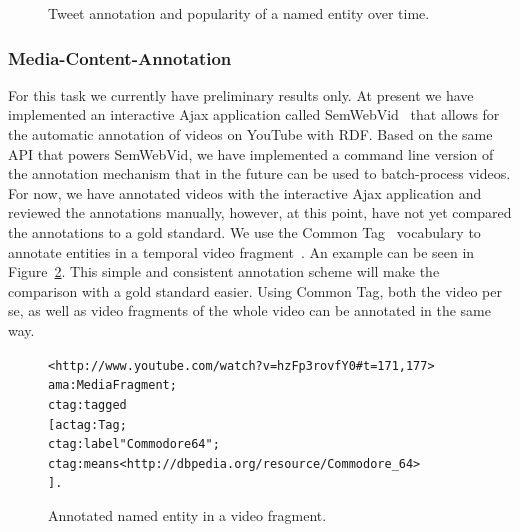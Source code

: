 \documentclass[runningheads,a4paper]{llncs}
\newenvironment{code}[1]
{\begin{lrbox}{\inverbatim}\begin{minipage}{12cm}\begin{alltt}{#1}}
{\end{alltt}\end{minipage}\end{lrbox}\colorbox{lightgray}{\usebox{\inverbatim}}}
\begin{document}
\begin{figure}[htb!]
  \begin{center}
\hspace{5pt}
  \caption{Tweet annotation and popularity of a named entity over time.}
  \label{fig:overtime}
  \end{center}  
\end{figure}

\subsubsection{Media-Content-Annotation}
For this task we currently have preliminary results only. At present we have implemented an interactive Ajax application called SemWebVid~\cite{semwebvid} that allows for the automatic annotation of videos on YouTube with RDF. Based on the same API that powers SemWebVid, we have implemented a command line version of the annotation mechanism that in the future can be used to batch-process videos. For now, we have annotated videos with the interactive Ajax application and reviewed the annotations manually, however, at this point, have not yet compared the annotations to a gold standard. We use the Common Tag~\cite{CommonTag:Spec} vocabulary to annotate entities in a temporal video fragment~\cite{W3C:MediaFrags}. An example can be seen in Figure~\ref{code:ctag}. This simple and consistent annotation scheme will make the comparison with a gold standard easier. Using Common Tag, both the video per se, as well as video fragments of the whole video can be annotated in the same way.

\begin{figure}[htbp!]
\begin{center}
{\footnotesize
\begin{code}
<http://www. youtube.com/watch?v=hzFp3rovfY0#t=171,177>
  a ma:MediaFragment ;
  ctag:tagged
    [ a ctag:Tag ;
      ctag:label "Commodore 64" ;
      ctag:means <http://dbpedia.org/resource/Commodore_64>
    ] .
\end{code}}
  \caption[Annotated named entity in a video fragment.]{Annotated named entity in a video fragment.}
  \label{code:ctag} 
  \end{center}  
\end{figure}
\end{document}
